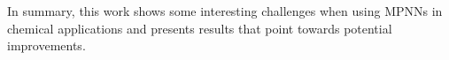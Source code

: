 In summary, this work shows some interesting challenges when using MPNNs in chemical applications and presents results that point towards potential improvements. 


\clearpage


\tableofcontents


\clearpage

